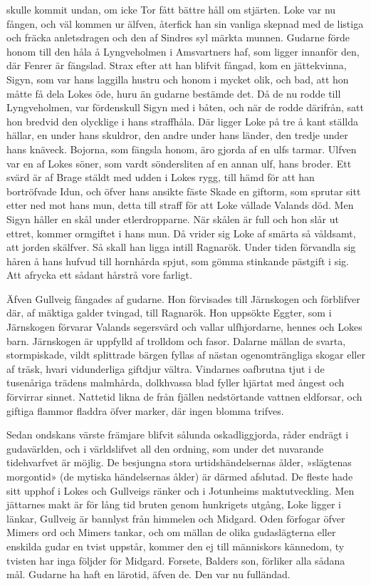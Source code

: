 skulle kommit undan, om icke Tor fått bättre håll om stjärten. Loke var
nu fången, och väl kommen ur älfven, återfick han sin vanliga skepnad
med de listiga och fräcka anletsdragen och den af Sindres syl märkta
munnen. Gudarne förde honom till den håla å Lyngveholmen i Amsvartners
haf, som ligger innanför den, där Fenrer är fängslad. Strax efter att
han blifvit fångad, kom en jättekvinna, Sigyn, som var hans laggilla
hustru och honom i mycket olik, och bad, att hon måtte få dela Lokes
öde, huru än gudarne bestämde det. Då de nu rodde till Lyngveholmen, var
fördenskull Sigyn med i båten, och när de rodde därifrån, satt hon
bredvid den olycklige i hans straffhåla. Där ligger Loke på tre å kant
ställda hällar, en under hans skuldror, den andre under hans länder, den
tredje under hans knäveck. Bojorna, som fängsla honom, äro gjorda af en
ulfs tarmar. Ulfven var en af Lokes söner, som vardt söndersliten af en
annan ulf, hans broder. Ett svärd är af Brage stäldt med udden i Lokes
rygg, till hämd för att han bortröfvade Idun, och öfver hans ansikte
fäste Skade en giftorm, som sprutar sitt etter ned mot hans mun, detta
till straff för att Loke vållade Valands död. Men Sigyn håller en skål
under etlerdropparne. När skålen är full och hon slår ut
ettret, kommer ormgiftet i hans mun. Då vrider sig Loke af smärta så
våldsamt, att jorden skälfver. Så skall han ligga intill Ragnarök. Under
tiden förvandla sig håren å hans hufvud till hornhårda spjut, som gömma
stinkande pästgift i sig. Att afrycka ett sådant hårstrå vore farligt.

Äfven Gullveig fångades af gudarne. Hon förvisades till Järnskogen och
förblifver där, af mäktiga galder tvingad, till Ragnarök. Hon uppsökte
Eggter, som i Järnskogen förvarar Valands segersvärd och vallar
ulfhjordarne, hennes och Lokes barn. Järnskogen är uppfylld af trolldom
och fasor. Dalarne mällan de svarta, stormpiskade, vildt splittrade
bärgen fyllas af nästan ogenomträngliga skogar eller af träsk, hvari
vidunderliga giftdjur vältra. Vindarnes oafbrutna tjut i de tusenåriga
trädens malmhårda, dolkhvassa blad fyller hjärtat med ångest och
förvirrar sinnet. Nattetid likna de från fjällen nedstörtande vattnen
eldforsar, och giftiga flammor fladdra öfver marker, där ingen blomma
trifves.

\sectionbreak

Sedan ondskans värste främjare blifvit sålunda oskadliggjorda, råder
endrägt i gudavärlden, och i världslifvet all den ordning, som under det
nuvarande tidehvarfvet är möjlig. De besjungna stora urtidshändelsernas
ålder, »slägtenas morgontid» (de mytiska händelsernas ålder) är därmed
afslutad. De fleste hade sitt upphof i Lokes och Gullveigs ränker och i
Jotunheims maktutveckling. Men jättarnes makt är för lång tid bruten
genom hunkrigets utgång, Loke ligger i länkar, Gullveig är bannlyst från
himmelen och Midgard. Oden förfogar öfver Mimers ord och Mimers tankar,
och om mällan de olika gudaslägterna eller enskilda gudar en tvist
uppstår, kommer den ej till människors kännedom, ty tvisten har inga
följder för Midgard. Forsete, Balders son, förliker alla sådana mål.
Gudarne ha haft en lärotid, äfven de. Den var nu fulländad.


